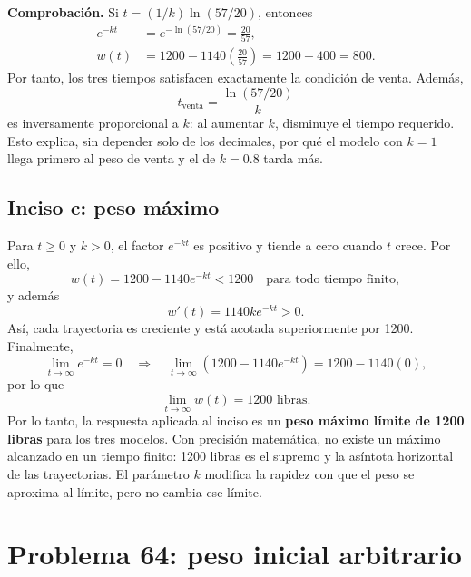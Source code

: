 \textbf{Comprobación.} Si $t=(1/k)\ln(57/20)$, entonces
\begin{align*}
 e^{-kt}&=e^{-\ln(57/20)}=\frac{20}{57},\\
 w(t)&=1200-1140\left(\frac{20}{57}\right)
	=1200-400=800.
\end{align*}
Por tanto, los tres tiempos satisfacen exactamente la condición de venta. Además,
\[
 t_{\mathrm{venta}}=\frac{\ln(57/20)}{k}
\]
es inversamente proporcional a $k$: al aumentar $k$, disminuye el tiempo requerido. Esto explica, sin depender solo de los decimales, por qué el modelo con $k=1$ llega primero al peso de venta y el de $k=0.8$ tarda más.

\subsection{Inciso c: peso máximo}
Para $t\geq0$ y $k>0$, el factor $e^{-kt}$ es positivo y tiende a cero cuando $t$ crece. Por ello,
\[
 w(t)=1200-1140e^{-kt}<1200
 \quad\text{para todo tiempo finito},
\]
y además
\[
 w'(t)=1140ke^{-kt}>0.
\]
Así, cada trayectoria es creciente y está acotada superiormente por 1200. Finalmente,
\[
 \lim_{t\to\infty}e^{-kt}=0
 \quad\Longrightarrow\quad
 \lim_{t\to\infty}\left(1200-1140e^{-kt}\right)=1200-1140(0),
\]
por lo que
\[
 \boxed{\lim_{t\to\infty}w(t)=1200\text{ libras}}.
\]
Por lo tanto, la respuesta aplicada al inciso es un \textbf{peso máximo límite de 1200 libras} para los tres modelos. Con precisión matemática, no existe un máximo alcanzado en un tiempo finito: 1200 libras es el supremo y la asíntota horizontal de las trayectorias. El parámetro $k$ modifica la rapidez con que el peso se aproxima al límite, pero no cambia ese límite.

\section{Problema 64: peso inicial arbitrario}

